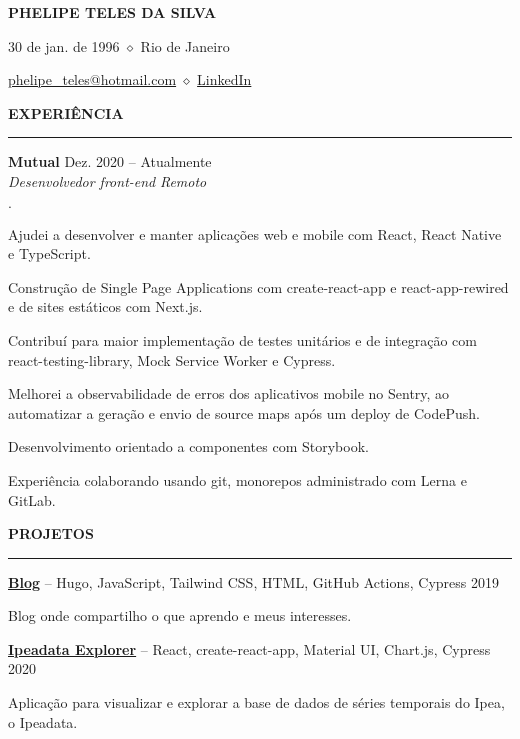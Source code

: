 \documentclass[11pt,letterpaper]{article}
\newenvironment{tightlist}
  {\begin{list}
    {$\cdot$}
    {
      \setlength{\leftmargin}{0em}
      \setlength{\itemsep}{-0.5em}
    }
    \smallskip
  }
{\end{list}}
\begin{document}
\pagestyle{empty}

\centerline{\huge\bf PHELIPE TELES DA SILVA}
\medskip

\centerline{30 de jan. de 1996 $\diamond$ Rio de Janeiro}
\smallskip

\centerline{
  \href{mailto:phelipe_teles@hotmail.com}{phelipe\_teles@hotmail.com} $\diamond$ \href{https://linkedin.com/in/phelipeteles}{LinkedIn}
}
\smallskip

\medskip \textbf{EXPERIÊNCIA} \medskip
\hrule

\textbf{Mutual} \hfill Dez. 2020 -- Atualmente \\
\emph{Desenvolvedor front-end} \hfill \emph{Remoto} {\parfillskip=0pt\par}

\begin{tightlist}
  \item Ajudei a desenvolver e manter aplicações web e mobile com React, React
    Native e TypeScript.
  \item Construção de Single Page Applications com create-react-app e
    react-app-rewired e de sites estáticos com Next.js.
  \item Contribuí para maior implementação de testes unitários e de integração
    com react-testing-library, Mock Service Worker e Cypress.
  \item Melhorei a observabilidade de erros dos aplicativos mobile no Sentry, ao
    automatizar a geração e envio de source maps após um deploy de CodePush.
  \item Desenvolvimento orientado a componentes com Storybook.
  \item Experiência colaborando usando git, monorepos administrado com Lerna e
    GitLab.
\end{tightlist}

\medskip \textbf{PROJETOS} \medskip
\hrule

\textbf{\href{https://phelipetls.github.io}{Blog}} -- Hugo, JavaScript, Tailwind CSS, HTML, GitHub Actions, Cypress \hfill 2019
{\parfillskip=0pt\par}
Blog onde compartilho o que aprendo e meus interesses.

\medskip

\textbf{\href{http://ipeadata-explorer.surge.sh}{Ipeadata Explorer}} -- React, create-react-app, Material UI, Chart.js, Cypress \hfill 2020
{\parfillskip=0pt\par}
Aplicação para visualizar e explorar a base de dados de séries temporais
  do Ipea, o Ipeadata.
\end{document}
